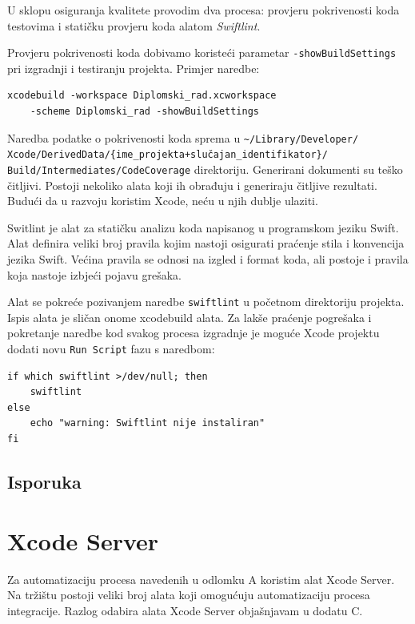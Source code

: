 \documentclass[times, utf8, diplomski, numeric]{fer}
\begin{document}
\begin{appendices}
U sklopu osiguranja kvalitete provodim dva procesa: provjeru pokrivenosti koda testovima i statičku provjeru koda alatom \textit{Swiftlint}.

Provjeru pokrivenosti koda dobivamo koristeći parametar \verb|-showBuildSettings| pri izgradnji i testiranju projekta. Primjer naredbe:

\begin{verbatim}
xcodebuild -workspace Diplomski_rad.xcworkspace
    -scheme Diplomski_rad -showBuildSettings
\end{verbatim}

Naredba podatke o pokrivenosti koda sprema u \verb|~/Library/Developer/|\\\verb|Xcode/DerivedData/{ime_projekta+slučajan_identifikator}/|\\\verb|Build/Intermediates/CodeCoverage| direktoriju. Generirani dokumenti su teško čitljivi. Postoji nekoliko alata koji ih obrađuju i generiraju čitljive rezultati. Budući da u razvoju koristim Xcode, neću u njih dublje ulaziti.

Switlint je alat za statičku analizu koda napisanog u programskom jeziku Swift. Alat definira veliki broj pravila kojim nastoji osigurati praćenje stila i konvencija jezika Swift. Većina pravila se odnosi na izgled i format koda, ali postoje i pravila koja nastoje izbjeći pojavu grešaka.

Alat se pokreće pozivanjem naredbe \verb|swiftlint| u početnom direktoriju projekta. Ispis alata je sličan onome xcodebuild alata. Za lakše praćenje pogrešaka i pokretanje naredbe kod svakog procesa izgradnje je moguće Xcode projektu dodati novu \verb|Run Script| fazu s naredbom:

\begin{verbatim}
if which swiftlint >/dev/null; then
    swiftlint
else
    echo "warning: Swiftlint nije instaliran"
fi
\end{verbatim}

\section{Isporuka}

\chapter{Xcode Server}

Za automatizaciju procesa navedenih u odlomku A koristim alat Xcode Server. Na tržištu postoji veliki broj alata koji omogućuju automatizaciju procesa integracije. Razlog odabira alata Xcode Server objašnjavam u dodatu C.


\end{appendices}
\end{document}
